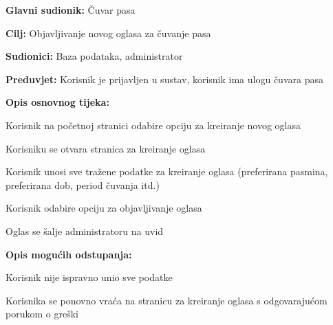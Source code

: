 					\noindent {}
					\begin{packed_item}
						
						\item \textbf{Glavni sudionik: } Čuvar pasa
						\item  \textbf{Cilj:} Objavljivanje novog oglasa za čuvanje pasa
						\item  \textbf{Sudionici:} Baza podataka, administrator
						\item  \textbf{Preduvjet:} Korisnik je prijavljen u sustav, korisnik ima ulogu čuvara pasa
						\item  \textbf{Opis osnovnog tijeka:}
						
						\item[] \begin{packed_enum}
							
							\item Korisnik na početnoj stranici odabire opciju za kreiranje novog oglasa     
							\item Korisniku se otvara stranica za kreiranje oglasa  
							\item Korisnik unosi sve tražene podatke za kreiranje oglasa (preferirana pasmina, preferirana dob, period čuvanja itd.)
							\item Korisnik odabire opciju za objavljivanje oglasa
							\item Oglas se šalje administratoru na uvid
							
						\end{packed_enum}
						
						\item  \textbf{Opis mogućih odstupanja:}
						
						\item[] \begin{packed_item}
							
							\item[4.a] Korisnik nije ispravno unio sve podatke
							\item[] \begin{packed_enum}
								
								\item Korisnika se ponovno vraća na stranicu za kreiranje oglasa s odgovarajućom porukom o greški 
								
							\end{packed_enum}
						\end{packed_item}
					\end{packed_item}	
				

